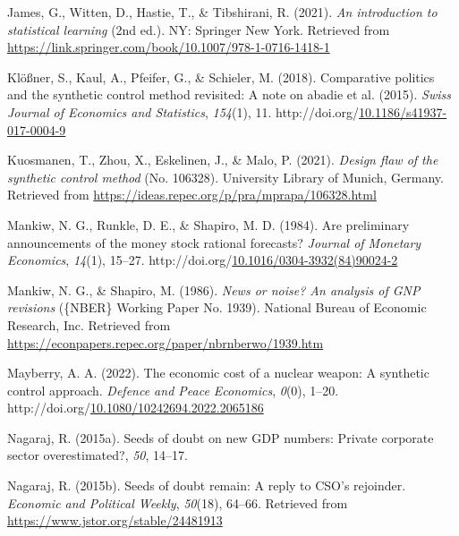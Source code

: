 \documentclass[12pt,nobind, a4paper]{reedthesis}
\newlength{\cslhangindent}
\newenvironment{CSLReferences}[2] %
{%
	\setlength{\parindent}{0pt}
	\ifodd #1 \everypar{\setlength{\hangindent}{\cslhangindent}}\ignorespaces\fi
	\ifnum #2 > 0
	\setlength{\parskip}{#2\baselineskip}
	\fi
}%
{}
\begin{document}
\begin{CSLReferences}{1}{0}
 \leavevmode{}%
 James, G., Witten, D., Hastie, T., \& Tibshirani, R. (2021). \emph{An introduction to statistical learning} (2nd ed.). {NY}: Springer New York. Retrieved from \url{https://link.springer.com/book/10.1007/978-1-0716-1418-1}

 \leavevmode{}%
 Klößner, S., Kaul, A., Pfeifer, G., \& Schieler, M. (2018). Comparative politics and the synthetic control method revisited: A note on abadie et al. (2015). \emph{Swiss Journal of Economics and Statistics}, \emph{154}(1), 11. http://doi.org/\href{https://doi.org/10.1186/s41937-017-0004-9}{10.1186/s41937-017-0004-9}

 \leavevmode{}%
 Kuosmanen, T., Zhou, X., Eskelinen, J., \& Malo, P. (2021). \emph{Design flaw of the synthetic control method} (No. 106328). University Library of Munich, Germany. Retrieved from \url{https://ideas.repec.org/p/pra/mprapa/106328.html}

 \leavevmode{}%
 Mankiw, N. G., Runkle, D. E., \& Shapiro, M. D. (1984). Are preliminary announcements of the money stock rational forecasts? \emph{Journal of Monetary Economics}, \emph{14}(1), 15--27. http://doi.org/\href{https://doi.org/10.1016/0304-3932(84)90024-2}{10.1016/0304-3932(84)90024-2}

 \leavevmode{}%
 Mankiw, N. G., \& Shapiro, M. (1986). \emph{News or noise? An analysis of {GNP} revisions} (\{NBER\} Working Paper No. 1939). National Bureau of Economic Research, Inc. Retrieved from \url{https://econpapers.repec.org/paper/nbrnberwo/1939.htm}

 \leavevmode{}%
 Mayberry, A. A. (2022). The economic cost of a nuclear weapon: A synthetic control approach. \emph{Defence and Peace Economics}, \emph{0}(0), 1--20. http://doi.org/\href{https://doi.org/10.1080/10242694.2022.2065186}{10.1080/10242694.2022.2065186}

 \leavevmode{}%
 Nagaraj, R. (2015a). Seeds of doubt on new {GDP} numbers: Private corporate sector overestimated?, \emph{50}, 14--17.

 \leavevmode{}%
 Nagaraj, R. (2015b). Seeds of doubt remain: A reply to {CSO}'s rejoinder. \emph{Economic and Political Weekly}, \emph{50}(18), 64--66. Retrieved from \url{https://www.jstor.org/stable/24481913}


\end{CSLReferences}
\end{document}
